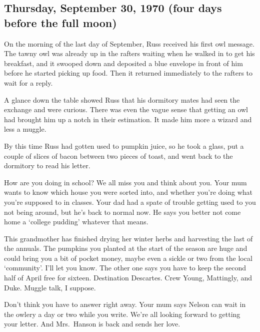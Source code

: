 \subsection{Thursday, September 30, 1970 (four days before the full moon)}

On the morning of the last day of September, Russ received his first owl message. The tawny owl was already up in the rafters waiting when he walked in to get his breakfast, and it swooped down and deposited a blue envelope in front of him before he started picking up food. Then it returned immediately to the rafters to wait for a reply.

A glance down the table showed Russ that his dormitory mates had seen the exchange and were curious. There was even the vague sense that getting an owl had brought him up a notch in their estimation. It made him more a wizard and less a muggle.

By this time Russ had gotten used to pumpkin juice, so he took a glass, put a couple of slices of bacon between two pieces of toast, and went back to the dormitory to read his letter.

\begin{writtenNote}


How are you doing in school? We all miss you and think about you. Your mum wants to know which house you were sorted into, and whether you're doing what you're supposed to in classes. Your dad had a spate of trouble getting used to you not being around, but he's back to normal now. He says you better not come home a `college pudding' whatever that means.

This grandmother has finished drying her winter herbs and harvesting the last of the annuals. The pumpkins you planted at the start of the season are huge and could bring you a bit of pocket money, maybe even a sickle or two from the local `community'. I'll let you know. The other one says you have to keep the second half of April free for sixteen. Destination Descartes. Crew Young, Mattingly, and Duke. Muggle talk, I suppose.

Don't think you have to answer right away. Your mum says Nelson can wait in the owlery a day or two while you write. We're all looking forward to getting your letter. And Mrs.~Hanson is back and sends her love.


\end{writtenNote}

